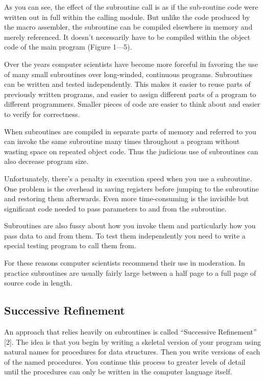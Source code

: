 As you can see, the effect of the subroutine call is as if the sub-routine
code were written out in full within the calling module. But unlike
the code produced by the macro assembler, the subroutine can be compiled
elsewhere in memory and merely referenced. It doesn't necessarily
have to be compiled within the object code of the main program (Figure
1---5).

Over the years computer scientists have become more forceful in favoring
the use of many small subroutines over long-winded, continuous programs.
Subroutines can be written and tested independently. This makes it
easier to reuse parts of previously written programs, and easier to
assign different parts of a program to different programmers. Smaller
pieces of code are easier to think about and easier to verify for
correctness.

When subroutines are compiled in separate parts of memory and referred
to you can invoke the same subroutine many times throughout a program
without wasting space on repeated object code. Thus the judicious
use of subroutines can also decrease program size. 

Unfortunately, there's a penalty in execution speed when you use a
subroutine. One problem is the overhead in saving registers before
jumping to the subroutine and restoring them afterwards. Even more
time-consuming is the invisible but significant code needed to pass
parameters to and from the subroutine.

Subroutines are also fussy about how you invoke them and particularly
how you pass data to and from them. To test them independently you
need to write a special testing program to call them from.

For these reasons computer scientists recommend their use in moderation.
In practice subroutines are usually fairly large between a half page
to a full page of source code in length.


\subsection*{Successive Refinement}

An approach that relies heavily on subroutines is called {}``Successive
Refinement'' {[}2{]}. The idea is that you begin by writing a skeletal
version of your program using natural names for procedures for data
structures. Then you write versions of each of the named procedures.
You continue this process to greater levels of detail until the procedures
can only be written in the computer language itself.

